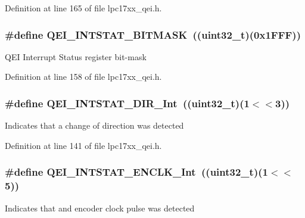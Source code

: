\-Definition at line 165 of file lpc17xx\-\_\-qei.\-h.

\hypertarget{group___q_e_i___private___macros_gabb60cd0187cbf49a7d5ad6d03ffe0914}{
\subsubsection[{\-Q\-E\-I\-\_\-\-I\-N\-T\-S\-T\-A\-T\-\_\-\-B\-I\-T\-M\-A\-S\-K}]{\setlength{\rightskip}{0pt plus 5cm}\#define {\bf \-Q\-E\-I\-\_\-\-I\-N\-T\-S\-T\-A\-T\-\_\-\-B\-I\-T\-M\-A\-S\-K}~((uint32\-\_\-t)(0x1\-F\-F\-F))}}\label{group___q_e_i___private___macros_gabb60cd0187cbf49a7d5ad6d03ffe0914}
\-Q\-E\-I \-Interrupt \-Status register bit-\/mask 

\-Definition at line 158 of file lpc17xx\-\_\-qei.\-h.

\hypertarget{group___q_e_i___private___macros_ga233b0fc7e81b87ed9345d3788935b4fd}{
\subsubsection[{\-Q\-E\-I\-\_\-\-I\-N\-T\-S\-T\-A\-T\-\_\-\-D\-I\-R\-\_\-\-Int}]{\setlength{\rightskip}{0pt plus 5cm}\#define {\bf \-Q\-E\-I\-\_\-\-I\-N\-T\-S\-T\-A\-T\-\_\-\-D\-I\-R\-\_\-\-Int}~((uint32\-\_\-t)(1$<$$<$3))}}\label{group___q_e_i___private___macros_ga233b0fc7e81b87ed9345d3788935b4fd}
\-Indicates that a change of direction was detected 

\-Definition at line 141 of file lpc17xx\-\_\-qei.\-h.

\hypertarget{group___q_e_i___private___macros_ga43ad79ac060e263fc25fbf66055bf50b}{
\subsubsection[{\-Q\-E\-I\-\_\-\-I\-N\-T\-S\-T\-A\-T\-\_\-\-E\-N\-C\-L\-K\-\_\-\-Int}]{\setlength{\rightskip}{0pt plus 5cm}\#define {\bf \-Q\-E\-I\-\_\-\-I\-N\-T\-S\-T\-A\-T\-\_\-\-E\-N\-C\-L\-K\-\_\-\-Int}~((uint32\-\_\-t)(1$<$$<$5))}}\label{group___q_e_i___private___macros_ga43ad79ac060e263fc25fbf66055bf50b}
\-Indicates that and encoder clock pulse was detected 

